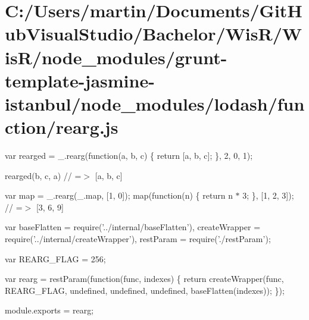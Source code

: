\hypertarget{_c_1_2_users_2martin_2_documents_2_git_hub_visual_studio_2_bachelor_2_wis_r_2_wis_r_2node_module2fd3ebfac7c829aecf11c49bf816ca07}{}\section{C\+:/\+Users/martin/\+Documents/\+Git\+Hub\+Visual\+Studio/\+Bachelor/\+Wis\+R/\+Wis\+R/node\+\_\+modules/grunt-\/template-\/jasmine-\/istanbul/node\+\_\+modules/lodash/function/rearg.\+js}
var rearged = \+\_\+.\+rearg(function(a, b, c) \{ return \mbox{[}a, b, c\mbox{]}; \}, 2, 0, 1);

rearged(\textquotesingle{}b\textquotesingle{}, \textquotesingle{}c\textquotesingle{}, \textquotesingle{}a\textquotesingle{}) // =$>$ \mbox{[}\textquotesingle{}a\textquotesingle{}, \textquotesingle{}b\textquotesingle{}, \textquotesingle{}c\textquotesingle{}\mbox{]}

var map = \+\_\+.\+rearg(\+\_\+.\+map, \mbox{[}1, 0\mbox{]}); map(function(n) \{ return n $\ast$ 3; \}, \mbox{[}1, 2, 3\mbox{]}); // =$>$ \mbox{[}3, 6, 9\mbox{]}


\begin{DoxyCodeInclude}
var baseFlatten = require(\textcolor{stringliteral}{'../internal/baseFlatten'}),
    createWrapper = require(\textcolor{stringliteral}{'../internal/createWrapper'}),
    restParam = require(\textcolor{stringliteral}{'./restParam'});

var REARG\_FLAG = 256;

var rearg = restParam(\textcolor{keyword}{function}(func, indexes) \{
  \textcolor{keywordflow}{return} createWrapper(func, REARG\_FLAG, undefined, undefined, undefined, baseFlatten(indexes));
\});

module.exports = rearg;
\end{DoxyCodeInclude}
 